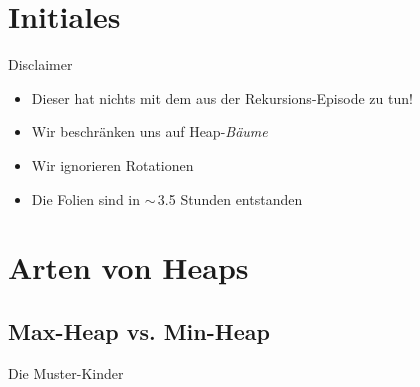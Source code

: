 


\section{Initiales}
\begin{frame}{Disclaimer}
    \begin{itemize}[<+(1)->]
        \itemsep12pt
        \item Dieser  hat nichts mit dem aus der Rekursions-\allowbreak Episode zu tun!
        \item Wir beschränken uns auf Heap-\textit{Bäume}
        \item Wir ignorieren Rotationen
        \item Die Folien sind in \(\sim\)\,3.5 Stunden entstanden
    \end{itemize}
\end{frame}
\SidebarReset

\section{Arten von Heaps}
\subsection{Max-Heap vs. Min-Heap}
\savebox{}
\begin{frame}{Die Muster-Kinder}
\begin{columns}[c]
    \begin{column}{.45\linewidth}
    \end{column} \begin{column}{.45\linewidth}
    \end{column}
\end{columns}
\end{frame}

